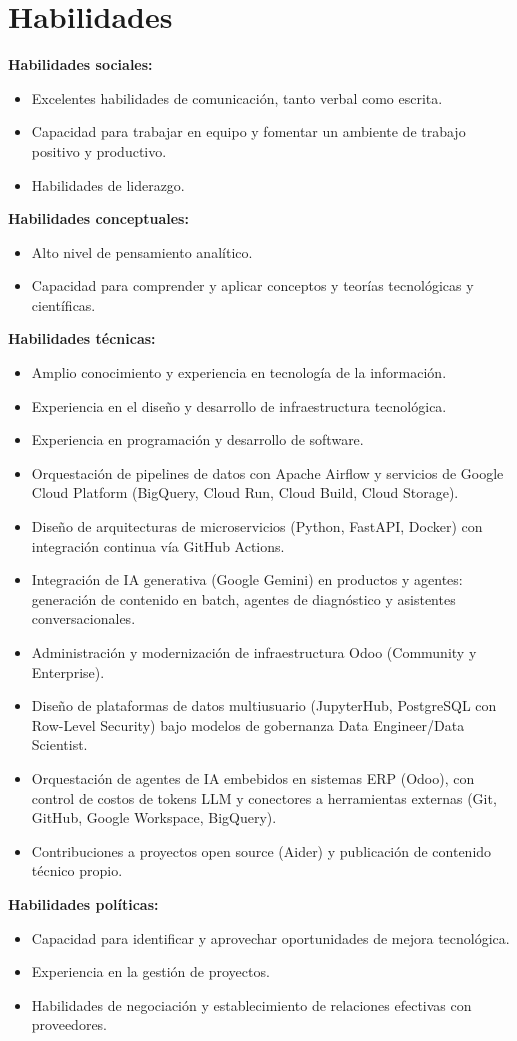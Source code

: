 \section{Habilidades}

\textbf{Habilidades sociales:}
\begin{itemize}
  \item Excelentes habilidades de comunicación, tanto verbal como escrita.
  \item Capacidad para trabajar en equipo y fomentar un ambiente de trabajo positivo y productivo.
  \item Habilidades de liderazgo.
\end{itemize}

\textbf{Habilidades conceptuales:}
\begin{itemize}
  \item Alto nivel de pensamiento analítico.
  \item Capacidad para comprender y aplicar conceptos y teorías tecnológicas y científicas.
\end{itemize}

\textbf{Habilidades técnicas:}
\begin{itemize}
  \item Amplio conocimiento y experiencia en tecnología de la información.
  \item Experiencia en el diseño y desarrollo de infraestructura tecnológica.
  \item Experiencia en programación y desarrollo de software.
  \item Orquestación de pipelines de datos con Apache Airflow y servicios de Google Cloud Platform (BigQuery, Cloud Run, Cloud Build, Cloud Storage).
  \item Diseño de arquitecturas de microservicios (Python, FastAPI, Docker) con integración continua vía GitHub Actions.
  \item Integración de IA generativa (Google Gemini) en productos y agentes: generación de contenido en batch, agentes de diagnóstico y asistentes conversacionales.
  \item Administración y modernización de infraestructura Odoo (Community y Enterprise).
  \item Diseño de plataformas de datos multiusuario (JupyterHub, PostgreSQL con Row-Level Security) bajo modelos de gobernanza Data Engineer/Data Scientist.
  \item Orquestación de agentes de IA embebidos en sistemas ERP (Odoo), con control de costos de tokens LLM y conectores a herramientas externas (Git, GitHub, Google Workspace, BigQuery).
  \item Contribuciones a proyectos open source (Aider) y publicación de contenido técnico propio.
\end{itemize}

\textbf{Habilidades políticas:}
\begin{itemize}
  \item Capacidad para identificar y aprovechar oportunidades de mejora tecnológica.
  \item Experiencia en la gestión de proyectos.
  \item Habilidades de negociación y establecimiento de relaciones efectivas con proveedores.
\end{itemize}


